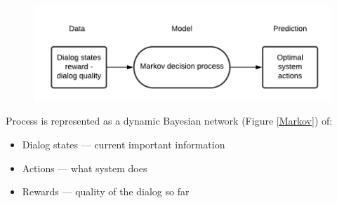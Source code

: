 \documentclass[12pt,titlepage,a4paper]{article}
\begin{document}
\begin{figure}[ht]
    \centering
    \includegraphics[width=0.8\linewidth]{training-state-tr-1.png}
    \caption{}
    \label{MDP}
\end{figure}

Process is represented as a dynamic Bayesian network (Figure \ref{Markov}) of: 
\begin{itemize}
    \item Dialog states --- current important information
    \item Actions --- what system does
    \item Rewards --- quality of the dialog so far
\end{itemize}
\end{document}
